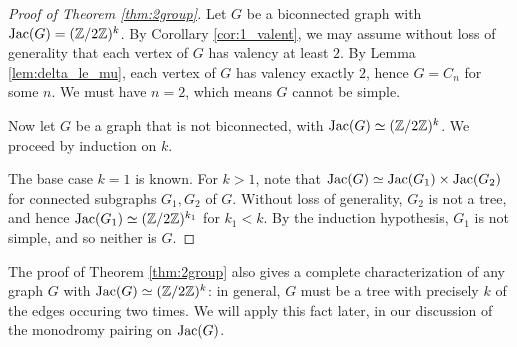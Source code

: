 \documentclass{amsart}
\begin{document}
\begin{proof}[Proof of Theorem \ref{thm:2group}]
  Let $G$ be a biconnected graph with $\operatorname{Jac}(G) = (\mathbb{Z}/2\mathbb{Z})^k$. By
  Corollary \ref{cor:1_valent}, we may assume without loss of
  generality that each vertex of $G$ has valency at least $2$. By
  Lemma \ref{lem:delta_le_mu}, each vertex of $G$ has valency exactly
  $2$, hence $G = C_n$ for some $n$. We must have $n=2$, which means $G$
  cannot be simple.

  Now let $G$ be a graph that is not biconnected, with $\operatorname{Jac}(G) \simeq
  (\mathbb{Z}/2\mathbb{Z})^k$. We proceed by induction on $k$.
  
  The base case $k=1$ is known. For $k > 1$, note that $\operatorname{Jac}(G) \simeq
  \operatorname{Jac}(G_1) \times \operatorname{Jac}(G_2)$ for connected subgraphs $G_1, G_2$ of
  $G$. Without loss of generality, $G_2$ is not a tree, and
  hence $\operatorname{Jac}(G_1) \simeq (\mathbb{Z}/2\mathbb{Z})^{k_1}$ for $k_1 < k$. By the
  induction hypothesis, $G_1$ is not simple, and so neither is $G$.
\end{proof}

\begin{remark}
  The proof of Theorem \ref{thm:2group} also gives a complete
  characterization of any graph $G$ with $\operatorname{Jac}(G) \simeq
  (\mathbb{Z}/2\mathbb{Z})^k$: in general, $G$ must be a tree with precisely $k$ of
  the edges occuring two times. We will apply this fact later, in our
  discussion of the monodromy pairing on $\operatorname{Jac}(G)$.
\end{remark}
\end{document}
